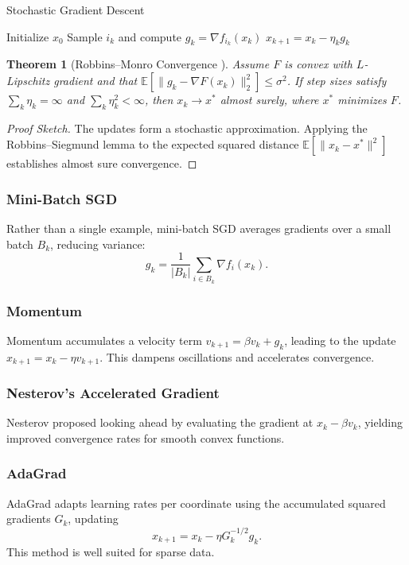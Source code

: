\documentclass[11pt]{book}
\newtheorem{theorem}{Theorem}[chapter]
\begin{document}
\begin{algorithm}
\caption{Stochastic Gradient Descent}
\begin{algorithmic}[1]
\STATE Initialize $x_0$
    \STATE Sample $i_k$ and compute $g_k = \nabla f_{i_k}(x_k)$
    \STATE $x_{k+1}=x_k-\eta_k g_k$
\ENDFOR
\end{algorithmic}
\end{algorithm}

\begin{theorem}[Robbins--Monro Convergence \cite{robbins1951}]
Assume $F$ is convex with $L$-Lipschitz gradient and that $\mathbb{E}[\|g_k-\nabla F(x_k)\|_2^2]\le\sigma^2$. If step sizes satisfy $\sum_k \eta_k=\infty$ and $\sum_k \eta_k^2<\infty$, then $x_k\to x^*$ almost surely, where $x^*$ minimizes $F$.
\end{theorem}
\begin{proof}[Proof Sketch]
The updates form a stochastic approximation. Applying the Robbins--Siegmund lemma to the expected squared distance $\mathbb{E}[\|x_k-x^*\|^2]$ establishes almost sure convergence.
\end{proof}

\subsubsection{Mini-Batch SGD}
Rather than a single example, mini-batch SGD averages gradients over a small batch $B_k$, reducing variance:
\begin{equation}
g_k = \frac{1}{|B_k|}\sum_{i\in B_k} \nabla f_i(x_k).
\end{equation}

\subsubsection{Momentum \cite{polyak1964}}
Momentum accumulates a velocity term $v_{k+1}=\beta v_k + g_k$, leading to the update $x_{k+1}=x_k-\eta v_{k+1}$. This dampens oscillations and accelerates convergence.

\subsubsection{Nesterov's Accelerated Gradient \cite{nesterov1983}}
Nesterov proposed looking ahead by evaluating the gradient at $x_k-\beta v_k$, yielding improved convergence rates for smooth convex functions.

\subsubsection{AdaGrad \cite{duchi2011}}
AdaGrad adapts learning rates per coordinate using the accumulated squared gradients $G_k$, updating
\begin{equation}
x_{k+1}=x_k-\eta G_k^{-1/2} g_k.
\end{equation}
This method is well suited for sparse data.
\end{document}
